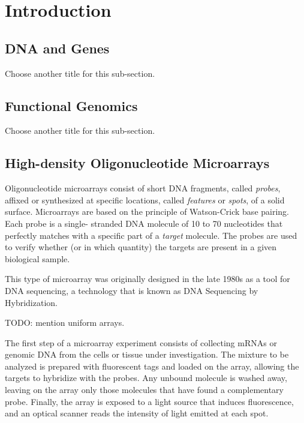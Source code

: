 \chapter{Introduction}
\label{ch:intro}

\section{DNA and Genes}
\label{sec:intro_genes}

Choose another title for this sub-section.

\section{Functional Genomics}
\label{sec:intro_funcgen}

Choose another title for this sub-section.

\section{High-density Oligonucleotide Microarrays}
\label{sec:intro_oligoarrays}

Oligonucleotide microarrays consist of short DNA fragments, called
\emph{probes}, affixed or synthesized at specific locations, called \emph{
features} or \emph{spots}, of a solid surface. Microarrays are based on the
principle of Watson-Crick base pairing. Each probe is a single- stranded DNA
molecule of 10 to 70 nucleotides that perfectly matches with a specific part of
a \emph{target} molecule. The probes are used to verify whether (or in which
quantity) the targets are present in a given biological sample.

This type of microarray was originally designed in the late 1980s as a tool for
DNA sequencing, a technology that is known as DNA Sequencing by Hybridization.

TODO: mention uniform arrays.

The first step of a microarray experiment consists of collecting mRNAs
or genomic DNA from the cells or tissue under investigation. The mixture
to be analyzed is prepared with fluorescent tags and loaded on the array,
allowing
the targets to hybridize with the probes. Any unbound molecule is
washed away, leaving on the array only those molecules that have found
a complementary probe. Finally, the array is exposed to a light source
that induces fluorescence, and an optical scanner reads the intensity
of light emitted at each spot.

